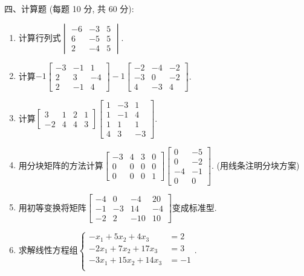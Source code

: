 \documentclass[12pt,a4paper]{ctexart}%
\begin{document}
%
\noindent 四、计算题 (每题 10 分, 共 60 分):%
\begin{enumerate}[1)]%
\item%
计算行列式$\begin{vmatrix}%
-6&-3&5\\%
6&-5&5\\%
2&-4&5%
\end{vmatrix}$.

\clearpage%
\item%
计算$-1\begin{bmatrix}
-3 & -1 & 1\\
2 & 3 & -4\\
2 & -1 & 4
\end{bmatrix} -1\begin{bmatrix}
-2 & -4 & -2\\
-3 & 0 & -2\\
4 & -3 & 4
\end{bmatrix}$.

\vspace{10cm}%
\item%
计算$\begin{bmatrix}
3 & 1 & 2 & 1\\
-2 & 4 & 4 & 3
\end{bmatrix}\begin{bmatrix}
1 & -3 & 1\\
1 & -1 & 4\\
1 & 1 & 1\\
4 & 3 & -3
\end{bmatrix}$.

\clearpage%
\item%
用分块矩阵的方法计算$\begin{bmatrix}
-3 & 4 & 3 & 0\\
0 & 0 & 0 & 0\\
0 & 0 & 0 & 1
\end{bmatrix}\begin{bmatrix}
0 & -5\\
0 & -2\\
-4 & -1\\
0 & 0
\end{bmatrix}$. (用线条注明分块方案)

\vspace{10cm}%
\item%
用初等变换将矩阵$\begin{bmatrix}
-4 & 0 & -4 & 20\\
-1 & -3 & 14 & -4\\
-2 & 2 & -10 & 10
\end{bmatrix}$变成标准型.

\clearpage%
\item%
求解线性方程组$\left\{\begin{array}{rl}
- x_{1} + 5x_{2} + 4x_{3}& =2 \\
- 2x_{1} + 7x_{2} + 17x_{3}& =3 \\
- 3x_{1} + 15x_{2} + 14x_{3}& =-1 \\
\end{array}\right.$.

\vspace{10cm}%
\end{enumerate}%
\end{document}
